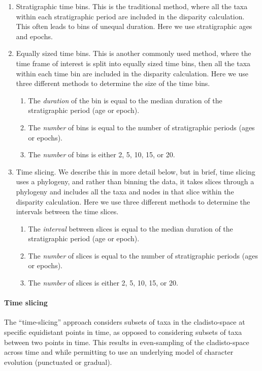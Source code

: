 \documentclass[12pt,a4paper]{article}
\begin{document}
\begin{enumerate}
  \item Stratigraphic time bins. This is the traditional method, where all the taxa within each stratigraphic period are included in the disparity calculation. This often leads to bins of unequal duration. Here we use stratigraphic ages and epochs.
  \item Equally sized time bins. This is another commonly used method, where the time frame of interest is split into equally sized time bins, then all the taxa within each time bin are included in the disparity calculation. Here we use three different methods to determine the size of the time bins. 
    \begin{enumerate}
      \item The \textit{duration} of the bin is equal to the median duration of the stratigraphic period (age or epoch).
      \item The \textit{number} of bins is equal to the number of stratigraphic periods (ages or epochs).
      \item The \textit{number} of bins is either 2, 5, 10, 15, or 20.
    \end{enumerate}
  \item Time slicing. We describe this in more detail below, but in brief, time slicing uses a phylogeny, and rather than binning the data, it takes slices through a phylogeny and includes all the taxa and nodes in that slice within the disparity calculation. Here we use three different methods to determine the intervals between the time slices.
    \begin{enumerate}
      \item The \textit{interval} between slices is equal to the median duration of the stratigraphic period (age or epoch).
      \item The \textit{number} of slices is equal to the number of stratigraphic periods (ages or epochs).
      \item The \textit{number} of slices is either 2, 5, 10, 15, or 20.
    \end{enumerate}  

\end{enumerate}

\paragraph{Time slicing} 
\label{time_slicing}
The ``time-slicing'' approach considers subsets of taxa in the cladisto-space at specific equidistant points in time, as opposed to considering subsets of taxa between two points in time.
This results in even-sampling of the cladisto-space across time and while permitting to use an underlying model of character evolution (punctuated or gradual). %
\end{document}
